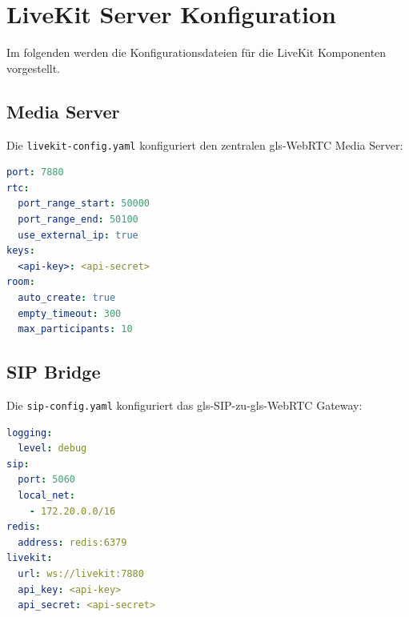 \section{LiveKit Server Konfiguration}
\label{sec:anhang-livekit}
Im folgenden werden die Konfigurationsdateien für die LiveKit Komponenten vorgestellt.
\subsection{Media Server}

Die \texttt{livekit-config.yaml} konfiguriert den zentralen \gls{gls-WebRTC} Media Server:

\begin{lstlisting}[language=yaml,caption={livekit-config.yaml - Media Server}]
port: 7880
rtc:
  port_range_start: 50000
  port_range_end: 50100
  use_external_ip: true
keys:
  <api-key>: <api-secret>
room:
  auto_create: true
  empty_timeout: 300
  max_participants: 10
\end{lstlisting}

\subsection{SIP Bridge}

Die \texttt{sip-config.yaml} konfiguriert das \gls{gls-SIP}-zu-\gls{gls-WebRTC} Gateway:

\begin{lstlisting}[language=yaml,caption={sip-config.yaml - SIP Bridge}]
logging:
  level: debug
sip:
  port: 5060
  local_net:
    - 172.20.0.0/16
redis:
  address: redis:6379
livekit:
  url: ws://livekit:7880
  api_key: <api-key>
  api_secret: <api-secret>
\end{lstlisting}


